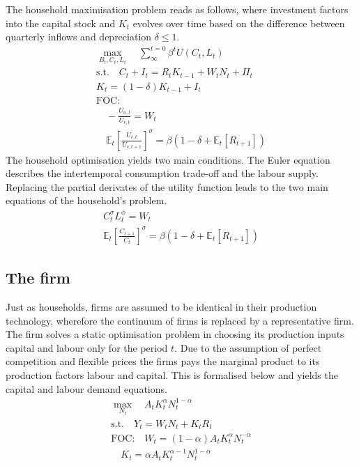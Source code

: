 \documentclass[12pt,a4paper,english]{article} %
\newcommand{\E}{\mathbb{E}} %
\begin{document}
	The household maximisation problem reads as follows, where investment factors into the capital stock and $K_t$ evolves over time based on the difference between quarterly inflows and depreciation $\delta \leq 1$.
	\begin{equation}
		\begin{aligned}
			\max_{B_t, C_t, L_t} \quad \sum_{\infty}^{t=0} \beta^{t} U(C_{t}, L_{t}) \\
			\textrm{s.t.} \quad C_t + I_t = R_t K_{t-1} + W_t N_t + \Pi_t \\
						  K_t = (1 - \delta) K_{t-1} + I_t \\
			\textrm{FOC:}\\
							 \quad - \frac{U_{n,t}}{U_{c, t}} = W_t \\
							 \quad	\E_t \left[ \frac{U_{c,t}}{U_{c,t+1}} \right]^{\sigma} = \beta \left( 1 - \delta + \E_t[R_{t+1}]\right)
		\end{aligned}
	\end{equation}
	The household optimisation yields two main conditions. The Euler equation describes the intertemporal consumption trade-off and the labour supply. Replacing the partial derivates of the utility function leads to the two main equations of the household's problem.
	\begin{equation} \label{eq:rbc_hh_foc}
		\begin{aligned}
			C_t^\sigma L_t^\phi	= W_t \\
			\E_t \left[ \frac{C_{t+1}}{C_t} \right]^\sigma = \beta \left(1 - \delta  + \E_t [R_{t+1}] \right)
		\end{aligned}
	\end{equation}

	\subsection{The firm}
	Just as households, firms are assumed to be identical in their production technology, wherefore the continuum of firms is replaced by a representative firm. The firm solves a static optimisation problem in choosing its production inputs capital and labour only for the period $t$. Due to the assumption of perfect competition and flexible prices the firms pays the marginal product to its production factors labour and capital. This is formalised below and yields the capital and labour demand equations.
	\begin{equation} \label{eq:rbc_firm_foc}
		\begin{aligned}
			\max_{N_t} \quad A_t K_t^\alpha N_t^{1 - \alpha} \\
			\textrm{s.t.} \quad Y_t = W_t N_t + K_t R_t\\
			\textrm{FOC:} \quad W_t = (1 - \alpha) A_t K_t^\alpha N_t^{-\alpha}\\
							\quad K_t = \alpha A_t K_t^{\alpha -1} N_t^{1-\alpha}
		\end{aligned}
	\end{equation}
\end{document}
